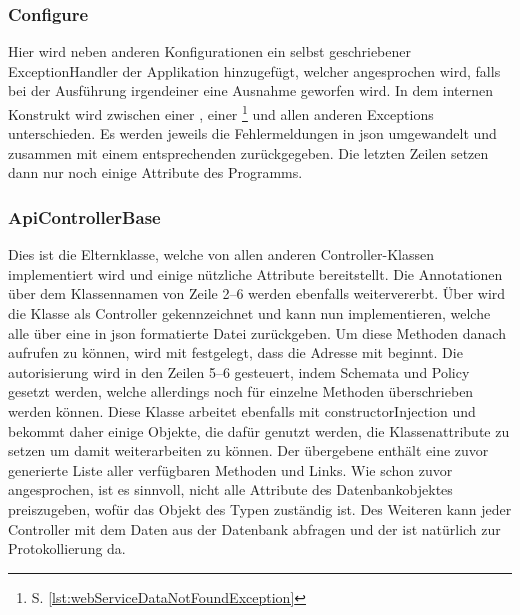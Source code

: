 	\subsubsection{Configure}\label{subsubsec:configure}
		Hier wird neben anderen Konfigurationen ein selbst geschriebener ExceptionHandler der Applikation hinzugefügt,
		welcher angesprochen wird,
		falls bei der Ausführung irgendeiner \httpMethode{} eine Ausnahme geworfen wird.
		In dem internen  Konstrukt wird zwischen einer
		,
		einer \footnote{S. \vref{lst:webServiceDataNotFoundException}}
		und allen anderen Exceptions unterschieden.
		Es werden jeweils die Fehlermeldungen in \gls{json} umgewandelt
		und zusammen mit einem entsprechenden \httpStatusCode{} zurückgegeben.
		Die letzten Zeilen setzen dann nur noch einige Attribute des Programms.

	\subsubsection{ApiControllerBase}\label{subsubsec:apicontrollerbase}
		Dies ist die Elternklasse,
		welche von allen anderen Controller-Klassen implementiert wird
		und einige nützliche Attribute bereitstellt.
		Die Annotationen über dem Klassennamen von Zeile 2--6 werden ebenfalls weitervererbt.
		Über \inlinelst{[ApiController]} wird die Klasse als Controller gekennzeichnet
		und kann nun \httpMethoden{} implementieren,
		welche alle über  eine in \gls{json} formatierte Datei zurückgeben.
		Um diese Methoden danach aufrufen zu können,
		wird mit  festgelegt,
		dass die Adresse mit  beginnt.
		Die \gls{autorisierung} wird in den Zeilen 5--6 gesteuert,
		indem Schemata und Policy gesetzt werden,
		welche allerdings noch für einzelne Methoden überschrieben werden können.
		Diese Klasse arbeitet ebenfalls mit \gls{constructorInjection} und bekommt daher einige Objekte,
		die dafür genutzt werden,
		die Klassenattribute zu setzen um damit weiterarbeiten zu können.
		Der übergebene  enthält eine
		zuvor generierte Liste aller verfügbaren Methoden und Links.
		Wie schon zuvor angesprochen,
		ist es sinnvoll,
		nicht alle Attribute des Datenbankobjektes preiszugeben,
		wofür das Objekt des Typen  zuständig ist.
		Des Weiteren kann jeder Controller mit dem 
		Daten aus der Datenbank abfragen und der 
		ist natürlich zur Protokollierung da.


